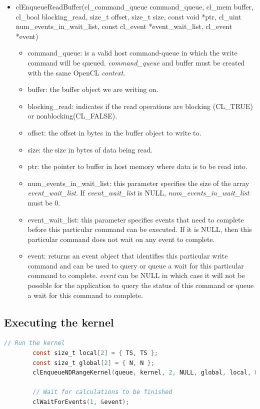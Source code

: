 \documentclass[titlepage]{article}
\begin{document}
\begin{itemize}
    \item clEnqueueReadBuffer(cl\_command\_queue command\_queue, cl\_mem buffer, cl\_bool blocking\_read, size\_t offset, size\_t size, const void *ptr, cl\_uint num\_events\_in\_wait\_list, const cl\_event *event\_wait\_list, cl\_event *event)
    \begin{itemize}
        \item command\_queue: is a valid host command-queue in which the write command will be queued. \textit{command\_queue} and buffer must be created with the same OpenCL \textit{context}.
        \item buffer: the buffer object we are writing on.
        \item blocking\_read: indicates if the read operations are blocking (CL\_TRUE) or nonblocking(CL\_FALSE).
        \item offset: the offset in bytes in the buffer object to write to.
        \item size: the size in bytes of data being read.
        \item ptr: the pointer to buffer in host memory where data is to be read into.
        \item num\_events\_in\_wait\_list: this parameter specifies the size of the array \textit{event\_wait\_list}. If \textit{event\_wait\_list} is NULL, \textit{num\_events\_in\_wait\_list} must be 0. 
        \item event\_wait\_list: this parameter specifies events that need to complete before this particular command can be executed. If it is NULL, then this particular command does not wait on any event to complete.
        \item event: returns an event object that identifies this particular write command and can be used to query or queue a wait for this particular command to complete. \textit{event} can be NULL in which case it will not be possible for the application to query the status of this command or queue a wait for this command to complete.
    \end{itemize}
\end{itemize}

\subsection{Executing the kernel}
\begin{minipage}{\linewidth}
\begin{lstlisting}[language=C, style=customc, breaklines=true]
        // Run the kernel
        const size_t local[2] = { TS, TS };
        const size_t global[2] = { N, N };
        clEnqueueNDRangeKernel(queue, kernel, 2, NULL, global, local, 0, NULL, &event);

        // Wait for calculations to be finished
        clWaitForEvents(1, &event);
\end{lstlisting}
\end{minipage}
\end{document}
